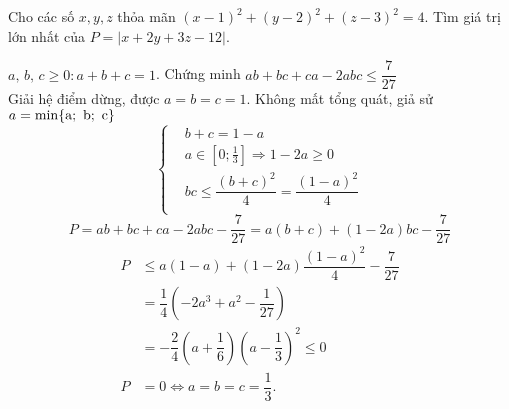 \begin{bt}%
	Cho các số $x, y, z$ thỏa mãn $(x-1)^2+(y-2)^2+(z-3)^2=4$. Tìm giá trị lớn nhất của $P=\left|x+2y+3z-12\right|$.
\end{bt}
\begin{bt}%
	$a, \,b, \, c \geq 0 : a+b+c=1$. Chứng minh $ab+bc+ca -2abc \leq \dfrac{7}{27}$\\
	\indent Giải hệ điểm dừng, được $a = b = c = 1$. Không mất tổng quát, giả sử $a = \text{min\{a;\, b; \,c\}}$ 
	$$\left\{\begin{aligned}
	&b+c=1-a\\
	&a \in \left[0; \frac{1}{3}\right] \Rightarrow 1-2a \geq 0\\
	&bc \leq \dfrac{\left(b+c\right)^2}{4} =\dfrac{\left(1-a\right)^2}{4}\\
	\end{aligned}\right.$$
	$$P=ab+bc+ca -2abc - \dfrac{7}{27}= a \left(b+c\right)+\left(1-2a\right)bc  - \dfrac{7}{27}$$
	\begin{align*}    
	P &\leq a\left(1-a\right)+\left(1-2a\right) \dfrac{\left(1-a\right)^2}{4}- \dfrac{7}{27}\\ &=\dfrac{1}{4}\left(-2a^3+a^2-\dfrac{1}{27}\right)\\ &= -\dfrac{2}{4}\left(a+\dfrac{1}{6}\right) \left(a-\dfrac{1}{3}\right)^2 \leq 0\\
	P&=0 \Leftrightarrow a=b=c= \dfrac{1}{3}.
	\end{align*}
\end{bt}
